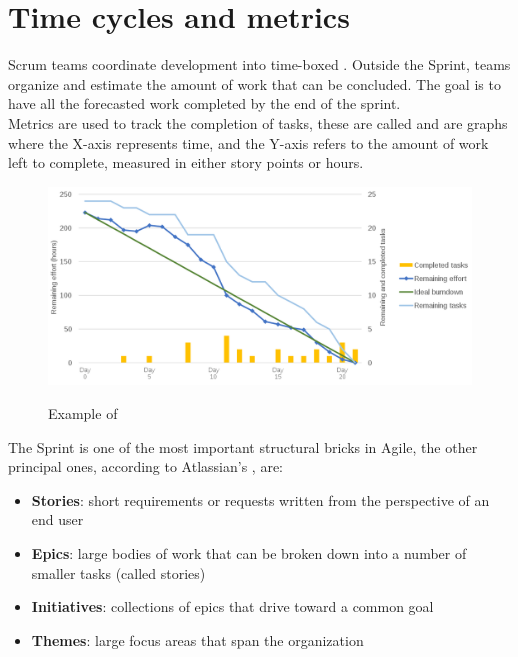 \section{Time cycles and metrics}\label{sec:metrics}
	Scrum teams coordinate development into time-boxed .
	Outside the Sprint, teams organize and estimate the amount of work that can be concluded.
	The goal is to have all the forecasted work completed by the end of the sprint.\\
	Metrics are used to track the completion of tasks, these are called  and are graphs where the X-axis represents time, and the Y-axis refers to the amount of work left to complete, measured in either story points or hours.
	\begin{figure}[H]
		\centering
		\includegraphics[width=.95\textwidth]{resources/burndown}\\
		\caption{Example of }
	\end{figure}
	The Sprint is one of the most important structural bricks in Agile, the other principal ones, according to Atlassian's \cite{epics-stories-themes}, are:
	\begin{itemize}
		\item \textbf{Stories}: short requirements or requests written from the perspective of an end user
		\item \textbf{Epics}: large bodies of work that can be broken down into a number of smaller tasks (called stories)
		\item \textbf{Initiatives}: collections of epics that drive toward a common goal
		\item \textbf{Themes}: large focus areas that span the organization
	\end{itemize}
	\vspace{-.5cm}
